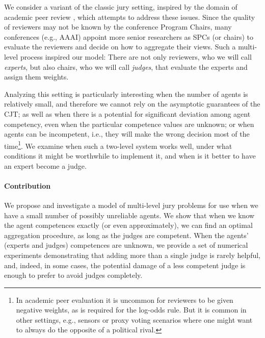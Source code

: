 \documentclass[letterpaper]{article} %
\newcommand{\nick}[1]{\todo[color=kentuckyblue!40,size=footnotesize]{Nick says: #1}}
\begin{document}
We consider a variant of the classic jury setting, inspired by the domain of academic peer review \cite{Shah22CACM}, which attempts to address these issues. Since the quality of reviewers may not be known by the conference Program Chairs, many conferences (e.g., AAAI) appoint more senior researchers as SPCs (or chairs) to evaluate the reviewers and decide on how to aggregate their views. Such a multi-level process inspired our model: There are not only reviewers, who we will call \emph{experts}, but also chairs, who we will call \emph{judges}, that evaluate the experts and assign them weights.

Analyzing this setting is particularly interesting when the number of agents is relatively small, and therefore we cannot rely on the asymptotic guarantees of the CJT; as well as when there is a potential for significant deviation among agent competency, even when the particular competence values are unknown; or when agents can be incompetent, i.e., they will make the wrong decision most of the time\footnote{In academic peer evaluation it is uncommon for reviewers to be given negative weights, as is required for the log-odds rule. But it is common in other settings, e.g., sensors or proxy voting scenarios where one might want to always do the opposite of a political rival.}. We examine when such a two-level system works well, under what conditions it might be worthwhile to implement it, and when is it better to have an expert become a judge.


\paragraph{Contribution}
We propose and investigate a model of multi-level jury problems for use when we have a small number of possibly unreliable agents. We show that when we know the agent competences exactly (or even approximately), we can find an optimal aggregation procedure, as long as the judges are competent. When the agents' (experts and judges) competences are unknown, we provide a set of numerical experiments demonstrating that adding more than a single judge is rarely helpful, and, indeed, in some cases, the potential damage of a less competent judge is enough to prefer to avoid judges completely.


\end{document}
